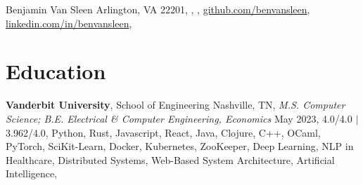 \documentclass[10.5pt]{article}
\newcommand{\postlinebreakspacing} {
  \vspace{0.4ex}
}
\begin{document}

\resumeheader
{Benjamin Van Sleen}
{
	{Arlington, VA 22201},
	\PHONE,
	\href{mailto:\EMAIL}{\EMAIL},
	\href{https://github.com/benvansleen}{github.com/benvansleen},
	\href{https://linkedin.com/in/benvansleen}{linkedin.com/in/benvansleen},
}

\section*{Education}
\postlinebreakspacing
\lines
{
	{\textbf{Vanderbit University}, School of Engineering \hfill Nashville, TN},
	\hspace*{1em}\textit{M.S. Computer Science; B.E. Electrical \& Computer Engineering, Economics} \hfill May 2023,
	 {4.0/4.0} $\mid$  {3.962/4.0},
	 {Python, Rust, Javascript, React, Java, Clojure, C++, OCaml, PyTorch, SciKit-Learn, Docker, Kubernetes, ZooKeeper},
	 {Deep Learning, NLP in Healthcare, Distributed Systems, Web-Based System Architecture, Artificial Intelligence},
}
\end{document}
